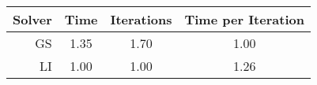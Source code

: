\begin{tabular}{@{} r c c c @{}}
    \toprule
    Solver & Time & Iterations & Time per Iteration \\
    \midrule

GS & 1.35 & 1.70 & 1.00 \\
LI & 1.00 & 1.00 & 1.26 \\

    \bottomrule
\end{tabular}